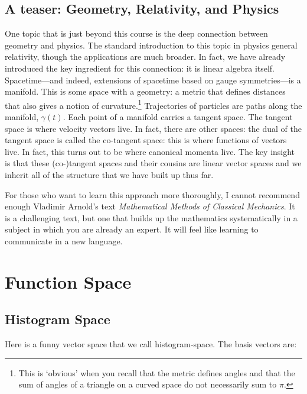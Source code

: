 \documentclass[
  11pt,
	colorful,
	raggedright,
]{tufte-style-thesis-flip}
\begin{document}

\section{A teaser: Geometry, Relativity, and Physics}

One topic that is just beyond this course is the deep connection between geometry and physics. The standard introduction to this topic in physics general relativity, though the applications are much broader. In fact, we have already introduced the key ingredient for this connection: it is linear algebra itself. Spacetime---and indeed, extensions of spacetime based on gauge symmetries---is a manifold. This is some space with a geometry: a metric that defines distances that also gives a notion of curvature.\footnote{This is `obvious' when you recall that the metric defines angles and that the sum of angles of a triangle on a curved space do not necessarily sum to $\pi$.} Trajectories of particles are paths along the manifold, $\gamma(t)$. Each point of a manifold carries a tangent space. The tangent space is where velocity vectors live. In fact, there are other spaces: the dual of the tangent space is called the co-tangent space: this is where functions of vectors live. In fact, this turns out to be where canonical momenta live. The key insight is that these (co-)tangent spaces and their cousins are linear vector spaces and we inherit all of the structure that we have built up thus far. 

For those who want to learn this approach more thoroughly, I cannot recommend enough Vladimir Arnold's text \emph{Mathematical Methods of Classical Mechanics}. It is a challenging text, but one that builds up the mathematics systematically in a subject in which you are already an expert. It will feel like learning to communicate in a new language.

\chapter{Function Space}

\section{Histogram Space}
\label{sec:histogramspace}

Here is a funny vector space that we call histogram-space. The basis vectors are:
\end{document}
